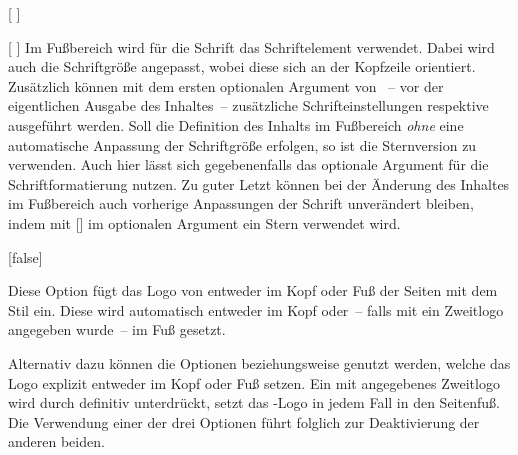 \begin{Declaration*}{}
\begin{Declaration*}{}
\begin{Declaration*}{}
\begin{Declaration}{%
  [%
  ]%
}
\begin{Declaration}[v2.04]{%
  [%
  ]%
}
Im Fußbereich wird für die Schrift das Schriftelement  
verwendet. Dabei wird auch die Schriftgröße angepasst, wobei diese sich an der 
Kopfzeile orientiert. Zusätzlich können mit dem ersten optionalen Argument von 
~-- vor der eigentlichen Ausgabe des Inhaltes~-- zusätzliche 
Schrifteinstellungen respektive  ausgeführt werden. Soll die 
Definition des Inhalts im Fußbereich \emph{ohne} eine automatische Anpassung 
der Schriftgröße erfolgen, so ist die Sternversion  zu 
verwenden. Auch hier lässt sich gegebenenfalls das optionale Argument für die 
Schriftformatierung nutzen.
Zu guter Letzt können bei der Änderung des Inhaltes im Fußbereich auch 
vorherige Anpassungen der Schrift unverändert bleiben, indem mit
[\POParameter{*}]
im optionalen Argument ein Stern verwendet wird. 
\end{Declaration}
\end{Declaration}

\begin{Declaration}[%
  v2.02:Logo von \DDC automatisch in Kopf/Fuß;%
  v2.02!\Option{ddc=colorblack};
  v2.02!\Option{ddc=gray};
  v2.02!\Option{ddc=black};
  v2.02!\Option{ddc=blue};
  v2.02!\Option{ddc=white};
]{}[false]
\begin{Declaration}[v2.02]{}
\begin{Declaration}[v2.02]{}
\printdeclarationlist%
%
%
%
%
%
Diese Option fügt das Logo von \DDC entweder im Kopf oder Fuß der Seiten mit 
dem Stil  ein. Diese wird automatisch entweder im Kopf 
oder~-- falls mit  ein Zweitlogo angegeben wurde~-- im Fuß 
gesetzt.

Alternativ dazu können die Optionen  beziehungsweise 
 genutzt werden, welche das Logo explizit entweder im Kopf oder 
Fuß setzen. Ein mit  angegebenes Zweitlogo wird durch 
 definitiv unterdrückt,  setzt das 
\DDC-Logo in jedem Fall in den Seitenfuß. Die Verwendung einer der drei 
Optionen führt folglich zur Deaktivierung der anderen beiden.


\end{Declaration}
\end{Declaration}
\end{Declaration}
\end{Declaration*}
\end{Declaration*}
\end{Declaration*}
